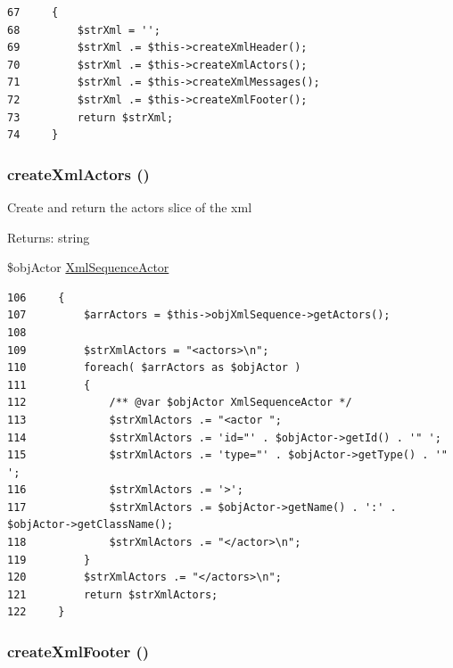 \begin{Code}\begin{verbatim}67     {
68         $strXml = '';
69         $strXml .= $this->createXmlHeader();
70         $strXml .= $this->createXmlActors();
71         $strXml .= $this->createXmlMessages();
72         $strXml .= $this->createXmlFooter();
73         return $strXml;
74     }
\end{verbatim}
\end{Code}


\hypertarget{class_xml_sequence_printer_xml_65c529c6ee2e9bbdfd1baa8a5a8fe1a5}{
\subsubsection[{createXmlActors}]{\setlength{\rightskip}{0pt plus 5cm}createXmlActors ()}}
\label{class_xml_sequence_printer_xml_65c529c6ee2e9bbdfd1baa8a5a8fe1a5}


Create and return the actors slice of the xml

\begin{Desc}
\item[Returns:]string \end{Desc}


\$objActor \hyperlink{class_xml_sequence_actor}{XmlSequenceActor} 

\begin{Code}\begin{verbatim}106     {
107         $arrActors = $this->objXmlSequence->getActors();
108         
109         $strXmlActors = "<actors>\n";
110         foreach( $arrActors as $objActor )
111         {
112             /** @var $objActor XmlSequenceActor */
113             $strXmlActors .= "<actor ";
114             $strXmlActors .= 'id="' . $objActor->getId() . '" ';
115             $strXmlActors .= 'type="' . $objActor->getType() . '" ';
116             $strXmlActors .= '>';
117             $strXmlActors .= $objActor->getName() . ':' . $objActor->getClassName();
118             $strXmlActors .= "</actor>\n";
119         }
120         $strXmlActors .= "</actors>\n";
121         return $strXmlActors;
122     }
\end{verbatim}
\end{Code}


\hypertarget{class_xml_sequence_printer_xml_c983c2020c960b39e98ed05baec4aedd}{
\subsubsection[{createXmlFooter}]{\setlength{\rightskip}{0pt plus 5cm}createXmlFooter ()}}
\label{class_xml_sequence_printer_xml_c983c2020c960b39e98ed05baec4aedd}


